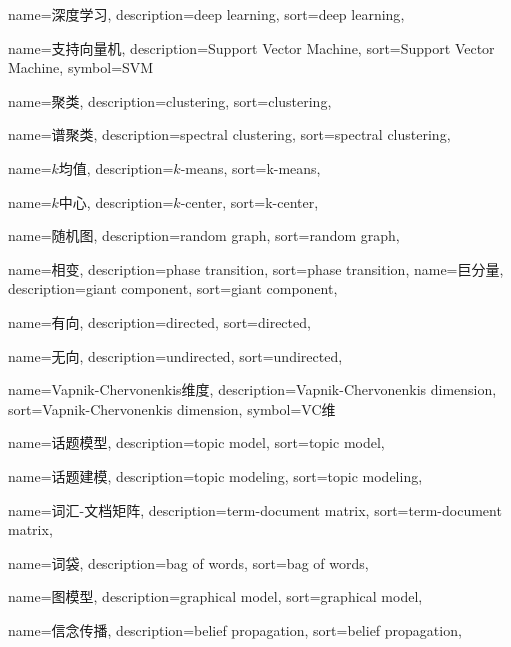 {
	name=深度学习,
	description={deep learning},
	sort={deep learning},
}

{
	name=支持向量机,
	description={Support Vector Machine},
	sort={Support Vector Machine},
	symbol=SVM
}

{
	name=聚类,
	description={clustering},
	sort={clustering},
}

{
	name=谱聚类,
	description={spectral clustering},
	sort={spectral clustering},
}

{
	name=$k$均值,
	description={$k$-means},
	sort={k-means},
}

{
	name=$k$中心,
	description={$k$-center},
	sort={k-center},
}

{
	name=随机图,
	description={random graph},
	sort={random graph},
}

{
	name=相变,
	description={phase transition},
	sort={phase transition},
}
{
	name=巨分量,
	description={giant component},
	sort={giant component},
}


{
	name=有向,
	description={directed},
	sort={directed},
}

{
	name=无向,
	description={undirected},
	sort={undirected},
}

{
	name=Vapnik-Chervonenkis维度,
	description={Vapnik-Chervonenkis dimension},
	sort={Vapnik-Chervonenkis dimension},
	symbol={VC维}
}

{
	name=话题模型,
	description={topic model},
	sort={topic model},
}

{
	name=话题建模,
	description={topic modeling},
	sort={topic modeling},
}

{
	name=词汇-文档矩阵,
	description={term-document matrix},
	sort={term-document matrix},
}

{
	name=词袋,
	description={bag of words},
	sort={bag of words},
}

{
	name=图模型,
	description={graphical model},
	sort={graphical model},
}

{
	name=信念传播,
	description={belief propagation},
	sort={belief propagation},
}

